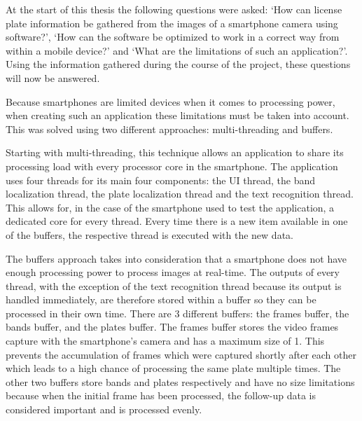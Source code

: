 
At the start of this thesis the following questions were asked: `How can license plate information be gathered from the images of a smartphone camera using software?', `How can the software be optimized to work in a correct way from within a mobile device?' and `What are the limitations of such an application?'. Using the information gathered during the course of the project, these questions will now be answered.



Because smartphones are limited devices when it comes to processing power, when creating such an application these limitations must be taken into account. This was solved using two different approaches: multi-threading and buffers.

Starting with multi-threading, this technique allows an application to share its processing load with every processor core in the smartphone. The application uses four threads for its main four components: the UI thread, the band localization thread, the plate localization thread and the text recognition thread. This allows for, in the case of the smartphone used to test the application, a dedicated core for every thread. Every time there is a new item available in one of the buffers, the respective thread is executed with the new data.

The buffers approach takes into consideration that a smartphone does not have enough processing power to process images at real-time. The outputs of every thread, with the exception of the text recognition thread because its output is handled immediately, are therefore stored within a buffer so they can be processed in their own time. There are 3 different buffers: the frames buffer, the bands buffer, and the plates buffer. 
The frames buffer stores the video frames capture with the smartphone's camera and has a maximum size of 1. This prevents the accumulation of frames which were captured shortly after each other which leads to a high chance of processing the same plate multiple times. The other two buffers store bands and plates respectively and have no size limitations because when the initial frame has been processed, the follow-up data is considered important and is processed evenly.

